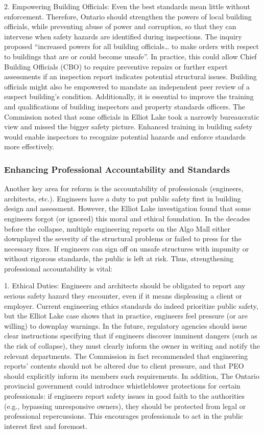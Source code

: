 \documentclass[12pt]{article}
\begin{document}
2. Empowering Building Officials: Even the best standards mean little without enforcement. Therefore, Ontario should strengthen the powers of local building officials, while preventing abuse of power and corruption, so that they can intervene when safety hazards are identified during inspections. The inquiry proposed “increased powers for all building officials… to make orders with respect to buildings that are or could become unsafe”. In practice, this could allow Chief Building Officials (CBO) to require preventive repairs or further expert assessments if an inspection report indicates potential structural issues. Building officials might also be empowered to mandate an independent peer review of a suspect building’s condition. Additionally, it is essential to improve the training and qualifications of building inspectors and property standards officers. The Commission noted that some officials in Elliot Lake took a narrowly bureaucratic view and missed the bigger safety picture. Enhanced training in building safety  would enable inspectors to recognize potential hazards and enforce standards more effectively. 



\subsubsection{Enhancing Professional Accountability and Standards}

Another key area for reform is the accountability of professionals (engineers, architects, etc.). Engineers have a duty to put public safety first in building design and assessment. However, the Elliot Lake investigation found that some engineers forgot (or ignored) this moral and ethical foundation. In the decades before the collapse, multiple engineering reports on the Algo Mall either downplayed the severity of the structural problems or failed to press for the necessary fixes. If engineers can sign off on unsafe structures with impunity or without rigorous standards, the public is left at risk. Thus, strengthening professional accountability is vital:


1. Ethical Duties: Engineers and architects should be obligated to report any serious safety hazard they encounter, even if it means displeasing a client or employer. Current engineering ethics standards do indeed prioritize public safety, but the Elliot Lake case shows that in practice, engineers feel pressure (or are willing) to downplay warnings. In the future, regulatory agencies should issue clear instructions specifying that if engineers discover imminent dangers (such as the risk of collapse), they must clearly inform the owner in writing and notify the relevant departments. The Commission in fact recommended that engineering reports’ contents should not be altered due to client pressure, and that PEO should explicitly inform its members such requirements. In addition, The Ontario provincial government could introduce whistleblower protections for certain professionals: if engineers report safety issues in good faith to the authorities (e.g., bypassing unresponsive owners), they should be protected from legal or professional repercussions. This encourages professionals to act in the public interest first and foremost.
\end{document}
